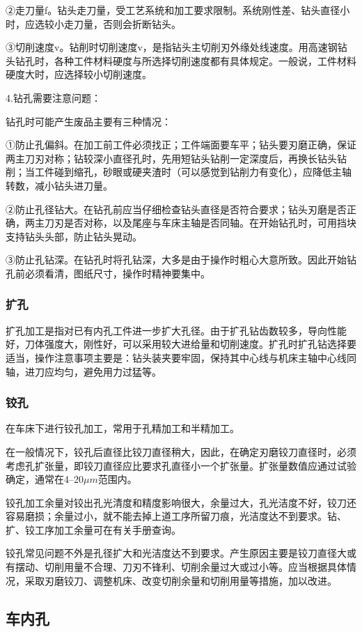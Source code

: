 \documentclass{ctexbook}
\begin{document}
②走刀量f。钻头走刀量，受工艺系统和加工要求限制。系统刚性差、钻头直径小时，应选较小走刀量，否则会折断钻头。

③切削速度v。钻削时切削速度v，是指钻头主切削刃外缘处线速度。用高速钢钻头钻孔时，各种工件材料硬度与所选择切削速度都有具体规定。一般说，工件材料硬度大时，应选择较小切削速度。

4.钻孔需要注意问题：

钻孔时可能产生废品主要有三种情况：

①防止孔偏斜。在加工前工件必须找正；工件端面要车平；钻头要刃磨正确，保证两主刀刃对称；钻较深小直径孔时，先用短钻头钻削一定深度后，再换长钻头钻削；当工件碰到缩孔，砂眼或硬夹渣时（可以感觉到钻削力有变化），应降低主轴转数，减小钻头进刀量。

②防止孔径钻大。在钻孔前应当仔细检查钻头直径是否符合要求；钻头刃磨是否正确，两主刀刃是否对称，以及尾座与车床主轴是否同轴。在开始钻孔时，可用挡块支持钻头头部，防止钻头晃动。

③防止孔钻深。在钻孔时将孔钻深，大多是由于操作时粗心大意所致。因此开始钻孔前必须看清，图纸尺寸，操作时精神要集中。
\subsubsection{扩孔}
扩孔加工是指对已有内孔工件进一步扩大孔径。由于扩孔钻齿数较多，导向性能好，刀体强度大，刚性好，可以采用较大进给量和切削速度。扩孔时扩孔钻选择要适当，操作注意事项主要是：钻头装夹要牢固，保持其中心线与机床主轴中心线同轴，进刀应均匀，避免用力过猛等。
\subsubsection{铰孔}
在车床下进行铰孔加工，常用于孔精加工和半精加工。

在一般情况下，铰孔后直径比铰刀直径稍大，因此，在确定刃磨铰刀直径时，必须考虑孔扩张量，即铰刀直径应比要求孔直径小一个扩张量。扩张量数值应通过试验确定，通常在4--20$\mu m$范围内。

铰孔加工余量对铰出孔光清度和精度影响很大，余量过大，孔光洁度不好，铰刀还容易磨损；余量过小，就不能去掉上道工序所留刀痕，光洁度达不到要求。钻、扩、铰工序加工余量可在有关手册查询。

铰孔常见问题不外是孔径扩大和光洁度达不到要求。产生原因主要是铰刀直径大或有摆动、切削用量不合理、刀刃不锋利、切削余量过大或过小等。应当根据具体情况，采取刃磨铰刀、调整机床、改变切削余量和切削用量等措施，加以改进。
\subsection{车内孔}
\end{document}
